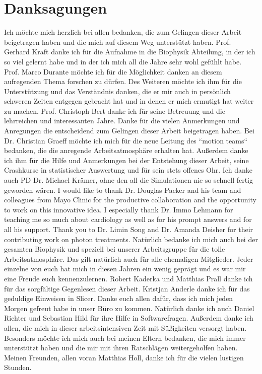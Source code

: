 
\chapter*{Danksagungen}
Ich m\"ochte mich herzlich bei allen bedanken, die zum Gelingen dieser Arbeit beigetragen haben und die mich auf diesem Weg unterst\"utzt haben. 
Prof. Gerhard Kraft danke ich f\"ur die Aufnahme in die Biophysik Abteilung, in der ich so viel gelernt habe und in der ich mich all die Jahre 
sehr wohl gef\"uhlt habe. 
Prof. Marco Durante m\"ochte ich f\"ur die M\"oglichkeit danken an diesem aufregenden Thema forschen zu d\"urfen. 
Des Weiteren m\"ochte ich ihm f\"ur die Unterst\"utzung und das Verst\"andnis danken, die er mir auch in pers\"onlich schweren Zeiten entgegen 
gebracht hat und in denen er mich ermutigt hat weiter zu machen.
Prof. Christoph Bert danke ich f\"ur seine Betreuung und die lehrreichen und interessanten Jahre. Danke f\"ur die 
vielen Anmerkungen und Anregungen die entscheidend zum Gelingen dieser Arbeit beigetragen haben. 
Bei Dr. Christian Graeff m\"ochte ich mich f\"ur die neue Leitung des ``motion teams`` bedanken, die die anregende Arbeitsatmosph\"are 
erhalten hat. Au{\ss}erdem danke ich ihm f\"ur die Hilfe und Anmerkungen bei der Entstehung dieser Arbeit, seine Crashkurse in statistischer 
Auswertung und f\"ur sein stets offenes Ohr. Ich danke auch PD Dr. Michael Kr\"amer, ohne den all die Simulationen nie so schnell fertig geworden w\"aren.\newline
\newline
I would like to thank Dr. Douglas Packer and his team and colleagues from Mayo Clinic for the productive collaboration and the opportunity to work on 
this innovative idea. I especially thank Dr. Immo Lehmann for teaching me so much about cardiology as well as for his prompt answers and for 
all his support. Thank you to Dr. Limin Song and Dr. Amanda Deisher for their contributing work on 
photon treatments. \newline
\newline
Nat\"urlich bedanke ich mich auch bei der gesamten Biophysik und speziell bei unserer Arbeitsgruppe f\"ur die tolle Arbeitsatmosph\"are. 
Das gilt nat\"urlich auch f\"ur alle ehemaligen Mitglieder. Jeder einzelne von euch hat mich in diesen Jahren ein wenig gepr\"agt und es 
war mir eine Freude euch kennenzulernen. 
Robert Kaderka und Matthias Prall danke ich f\"ur das sorgf\"altige Gegenlesen dieser Arbeit. Kristjan Anderle danke ich f\"ur das geduldige 
Einweisen in Slicer. Danke euch allen daf\"ur, dass ich mich jeden Morgen gefreut habe in unser B\"uro zu kommen. 
Nat\"urlich danke ich auch Daniel Richter und Sebastian Hild f\"ur ihre Hilfe in Softwarefragen. Au{\ss}erdem danke ich allen, die mich 
in dieser arbeitsintensiven Zeit mit S\"u{\ss}igkeiten versorgt haben.\newline
\newline
Besonders m\"ochte ich mich auch bei meinen Eltern bedanken, die mich immer unterst\"utzt haben und die mir mit ihren Ratschl\"agen 
weitergeholfen haben. Meinen Freunden, allen voran Matthias Holl, danke ich f\"ur die vielen lustigen Stunden. 
